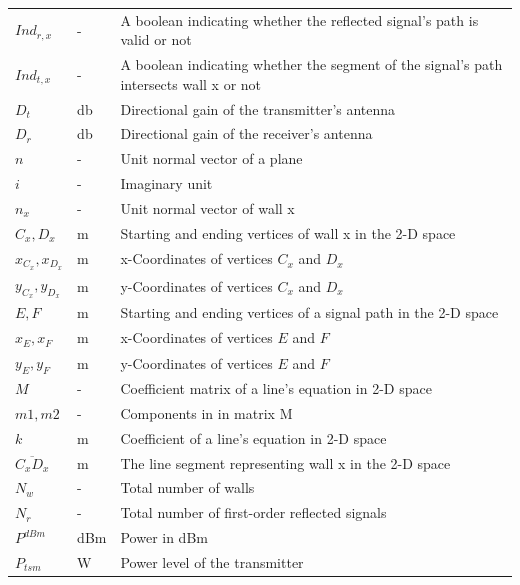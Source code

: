 \documentclass[12pt]{article}
\begin{document}
\begin{longtable*}{l l p{12cm}}
\\
$Ind_{r,x}$ & \si[per-mode=symbol] {-} & A boolean indicating whether the reflected signal's path is valid or not
\\
$Ind_{t,x}$ & \si[per-mode=symbol] {-} & A boolean indicating whether the segment of the signal's path intersects wall x or not
\\
$D_t$ & \si[per-mode=symbol] {\decibel} & Directional gain of the transmitter's antenna
\\
$D_r$ & \si[per-mode=symbol] {\decibel} & Directional gain of the receiver's antenna
\\
$n$ & \si[per-mode=symbol] {-} & Unit normal vector of a plane
\\
$i$ & \si[per-mode=symbol] {-} & Imaginary unit
\\
$n_x$ & \si[per-mode=symbol] {-} & Unit normal vector of wall x
\\
$C_x, D_x$ & \si[per-mode=symbol] {\metre} & Starting and ending vertices of wall x in the 2-D space
\\
$x_{C_x},x_{D_x}$ & \si[per-mode=symbol] {\metre} & x-Coordinates of vertices $C_x$ and $D_x$
\\
$y_{C_x},y_{D_x}$ & \si[per-mode=symbol] {\metre} & y-Coordinates of vertices $C_x$ and $D_x$
\\
$E, F$ & \si[per-mode=symbol] {\metre} & Starting and ending vertices of a signal path 
in the 2-D space
\\
$x_{E},x_{F}$ & \si[per-mode=symbol] {\metre} & x-Coordinates of vertices $E$ and $F$
\\
$y_{E},y_{F}$ & \si[per-mode=symbol] {\metre} & y-Coordinates of vertices $E$ and $F$
\\
$M$ & \si[per-mode=symbol] {-} & Coefficient matrix of a line's equation in 2-D space
\\
$m1,m2$ & \si[per-mode=symbol] {-} & Components in in matrix M
\\
$k$ & \si[per-mode=symbol] {\meter} & Coefficient of a line's equation in 2-D space
\\
$\overline{C_x D_x}$ & \si[per-mode=symbol] {\metre} & The line segment representing 
wall x in the 2-D space
\\
$N_w$ & \si[per-mode=symbol] {-} & Total number of walls
\\
$N_r$ & \si[per-mode=symbol] {-} & Total number of first-order reflected signals
\\
$P^{dBm}$ & \si[per-mode=symbol] {dBm} & Power in dBm
\\
$P_{tsm}$ & \si[per-mode=symbol] {\watt} & Power level of the transmitter

\end{longtable*}
\end{document}
